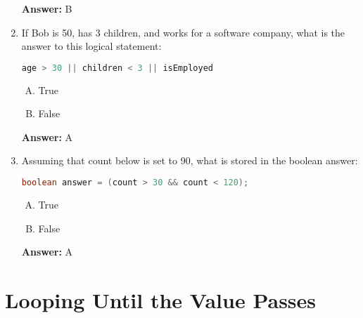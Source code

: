\documentclass[12pt]{article}
\begin{document}
\begin{enumerate}[1.]
    \bigskip

    \textbf{Answer:} B

    \item If Bob is 50, has 3 children, and works for a software company, what
    is the answer to this logical statement:

    \bigskip

    \begin{lstlisting}[language=Java]
    age > 30 || children < 3 || isEmployed
    \end{lstlisting}

    \begin{enumerate}[A.]
        \item True
        \item False
    \end{enumerate}

    \bigskip

    \textbf{Answer:} A

    \item Assuming that count below is set to 90, what is stored in the boolean
    answer:

    \bigskip

    \begin{lstlisting}[language=Java]
    boolean answer = (count > 30 && count < 120);
    \end{lstlisting}

    \begin{enumerate}[A.]
        \item True
        \item False
    \end{enumerate}

    \bigskip

    \textbf{Answer:} A

\end{enumerate}

\bigskip

\section{Looping Until the Value Passes}

\bigskip
\end{document}
